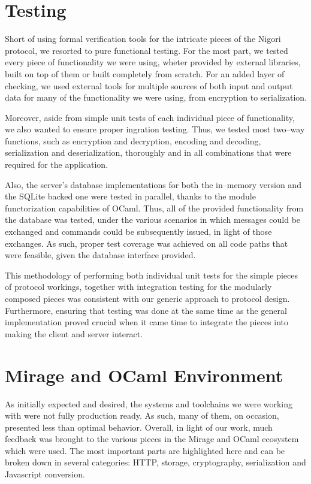 \section{Testing}
Short of using formal verification tools for the intricate pieces of the Nigori protocol, we resorted to pure functional testing.
For the most part, we tested every piece of functionality we were using, wheter provided by external libraries, built on top of them or built completely from scratch.
For an added layer of checking, we used external tools for multiple sources of both input and output data for many of the functionality we were using, from encryption to serialization.

Moreover, aside from simple unit tests of each individual piece of functionality, we also wanted to ensure proper ingration testing.
Thus, we tested most two--way functions, such as encryption and decryption, encoding and decoding, serialization and deserialization, thoroughly and in all combinations that were required for the application.

Also, the server's database implementations for both the in--memory version and the SQLite backed one were tested in parallel, thanks to the module functorization capabilities of OCaml.
Thus, all of the provided functionality from the database was tested, under the various scenarios in which messages could be exchanged and commands could be subsequently issued, in light of those exchanges.
As such, proper test coverage was achieved on all code paths that were feasible, given the database interface provided.

This methodology of performing both individual unit tests for the simple pieces of protocol workings, together with integration testing for the modularly composed pieces was consistent with our generic approach to protocol design.
Furthermore, ensuring that testing was done at the same time as the general implementation proved crucial when it came time to integrate the pieces into making the client and server interact.

\section{Mirage and OCaml Environment}
As initially expected and desired, the systems and toolchains we were working with were not fully production ready.
As such, many of them, on occasion, presented less than optimal behavior.
Overall, in light of our work, much feedback was brought to the various pieces in the Mirage and OCaml ecosystem which were used.
The most important parts are highlighted here and can be broken down in several categories: HTTP, storage, cryptography, serialization and Javascript conversion.


